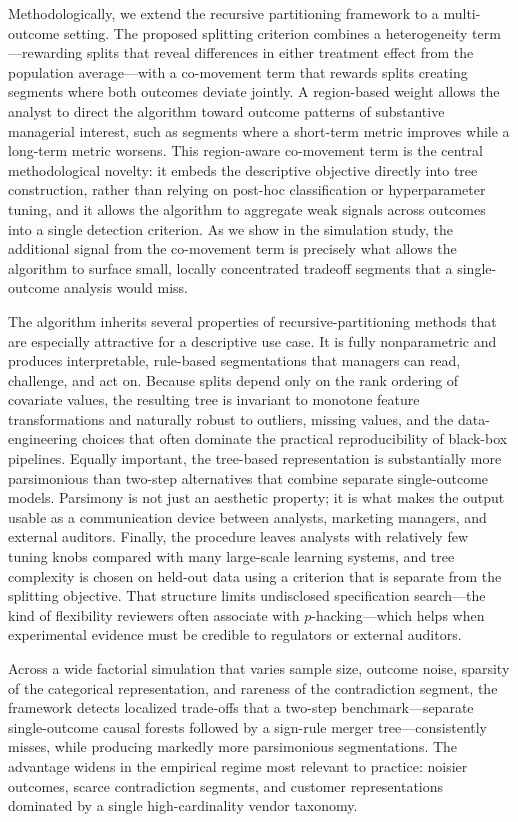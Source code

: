 \documentclass[11pt,letterpaper,english]{article}
\theoremstyle{definition}
\theoremstyle{definition}
\begin{document}
\begin{bibunit}
Methodologically, we extend the recursive partitioning framework \citep{athey2016recursive, wager2018estimation, athey2019grf} to a multi-outcome setting. The proposed splitting criterion combines a heterogeneity term---rewarding splits that reveal differences in either treatment effect from the population average---with a co-movement term that rewards splits creating segments where both outcomes deviate jointly. A region-based weight allows the analyst to direct the algorithm toward outcome patterns of substantive managerial interest, such as segments where a short-term metric improves while a long-term metric worsens. This region-aware co-movement term is the central methodological novelty: it embeds the descriptive objective directly into tree construction, rather than relying on post-hoc classification or hyperparameter tuning, and it allows the algorithm to aggregate weak signals across outcomes into a single detection criterion. As we show in the simulation study, the additional signal from the co-movement term is precisely what allows the algorithm to surface small, locally concentrated tradeoff segments that a single-outcome analysis would miss.

The algorithm inherits several properties of recursive-partitioning methods that are especially attractive for a descriptive use case. It is fully nonparametric and produces interpretable, rule-based segmentations that managers can read, challenge, and act on. Because splits depend only on the rank ordering of covariate values, the resulting tree is invariant to monotone feature transformations and naturally robust to outliers, missing values, and the data-engineering choices that often dominate the practical reproducibility of black-box pipelines. Equally important, the tree-based representation is substantially more parsimonious than two-step alternatives that combine separate single-outcome models. Parsimony is not just an aesthetic property; it is what makes the output usable as a communication device between analysts, marketing managers, and external auditors. Finally, the procedure leaves analysts with relatively few tuning knobs compared with many large-scale learning systems, and tree complexity is chosen on held-out data using a criterion that is separate from the splitting objective. That structure limits undisclosed specification search---the kind of flexibility reviewers often associate with $p$-hacking---which helps when experimental evidence must be credible to regulators or external auditors.

Across a wide factorial simulation that varies sample size, outcome noise, sparsity of the categorical representation, and rareness of the contradiction segment, the framework detects localized trade-offs that a two-step benchmark---separate single-outcome causal forests followed by a sign-rule merger tree---consistently misses, while producing markedly more parsimonious segmentations. The advantage widens in the empirical regime most relevant to practice: noisier outcomes, scarce contradiction segments, and customer representations dominated by a single high-cardinality vendor taxonomy.


\end{bibunit}
\end{document}
